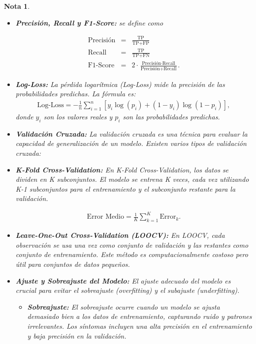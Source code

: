 \documentclass[12pt]{article}
\newtheorem{Note}{Nota}%
\begin{document}
\begin{Note}
\begin{itemize}
\item \textbf{Precisión, Recall y F1-Score:} se define como 

\begin{eqnarray}
\text{Precisión} &=& \frac{\text{TP}}{\text{TP} + \text{FP}} \\
\text{Recall} &=& \frac{\text{TP}}{\text{TP} + \text{FN}} \\
\text{F1-Score} &=& 2 \cdot \frac{\text{Precisión} \cdot \text{Recall}}{\text{Precisión} + \text{Recall}}.
\end{eqnarray}

\item \textbf{Log-Loss:} La pérdida logarítmica (Log-Loss) mide la precisión de las probabilidades predichas. La fórmula es:
\begin{eqnarray*}
\text{Log-Loss} = -\frac{1}{n} \sum_{i=1}^{n} \left[ y_i \log(p_i) + (1 - y_i) \log(1 - p_i) \right],
\end{eqnarray*}
donde $y_i$ son los valores reales y $p_i$ son las probabilidades predichas.

\item \textbf{Validación Cruzada:} La validación cruzada es una técnica para evaluar la capacidad de generalización de un modelo. Existen varios tipos de validación cruzada:

\item \textbf{K-Fold Cross-Validation:}  En K-Fold Cross-Validation, los datos se dividen en K subconjuntos. El modelo se entrena K veces, cada vez utilizando K-1 subconjuntos para el entrenamiento y el subconjunto restante para la validación.

\begin{eqnarray*}
\text{Error Medio} = \frac{1}{K} \sum_{k=1}^{K} \text{Error}_k.
\end{eqnarray*}

\item \textbf{Leave-One-Out Cross-Validation (LOOCV):} En LOOCV, cada observación se usa una vez como conjunto de validación y las restantes como conjunto de entrenamiento. Este método es computacionalmente costoso pero útil para conjuntos de datos pequeños.

\item \textbf{Ajuste y Sobreajuste del Modelo:} El ajuste adecuado del modelo es crucial para evitar el sobreajuste (overfitting) y el subajuste (underfitting).
\begin{itemize}
\item \textbf{Sobreajuste:} El sobreajuste ocurre cuando un modelo se ajusta demasiado bien a los datos de entrenamiento, capturando ruido y patrones irrelevantes. Los síntomas incluyen una alta precisión en el entrenamiento y baja precisión en la validación.


\end{itemize}
\end{itemize}
\end{Note}
\end{document}
